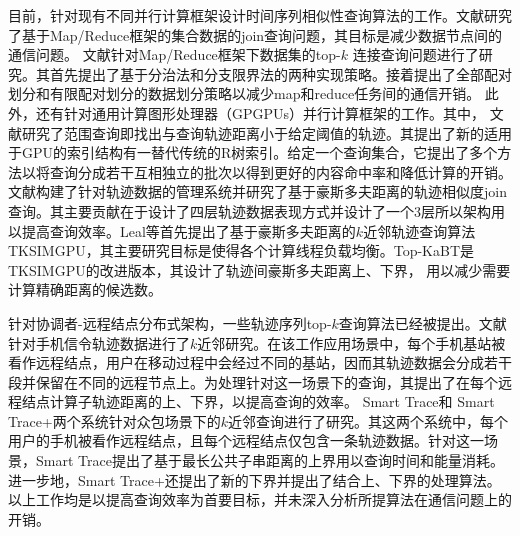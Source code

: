 目前，针对现有不同并行计算框架设计时间序列相似性查询算法的工作。文献\cite{kimICDE2012}研究了基于Map/Reduce框架的集合数据的join查询问题，其目标是减少数据节点间的通信问题。
文献\cite{kimICDE2012}针对Map/Reduce框架下数据集的top-$k$ 连接查询问题进行了研究。其首先提出了基于分治法和分支限界法的两种实现策略。接着提出了全部配对划分和有限配对划分的数据划分策略以减少map和reduce任务间的通信开销。
此外，还有针对通用计算图形处理器（GPGPUs）并行计算框架的工作\cite{GowanlockC14,Zhang2012U2STRA,LealGZY15}。其中，
文献\cite{GowanlockC14}研究了范围查询即找出与查询轨迹距离小于给定阈值的轨迹。其提出了新的适用于GPU的索引结构有一替代传统的R树索引。给定一个查询集合，它提出了多个方法以将查询分成若干互相独立的批次以得到更好的内容命中率和降低计算的开销。
文献\cite{Zhang2012U2STRA}构建了针对轨迹数据的管理系统并研究了基于豪斯多夫距离的轨迹相似度join查询。其主要贡献在于设计了四层轨迹数据表现方式并设计了一个3层所以架构用以提高查询效率。Leal等\cite{LealGZY15}首先提出了基于豪斯多夫距离的$k$近邻轨迹查询算法TKSIMGPU，其主要研究目标是使得各个计算线程负载均衡。Top-KaBT\cite{LealGZY16}是TKSIMGPU的改进版本，其设计了轨迹间豪斯多夫距离上、下界， 用以减少需要计算精确距离的候选数。

针对协调者-远程结点分布式架构，一些轨迹序列top-$k$查询算法已经被提出\cite{CIKMSimilarity,SmartTrace,crowdsourced}。文献\cite{CIKMSimilarity}针对手机信令轨迹数据进行了$k$近邻研究。在该工作应用场景中，每个手机基站被看作远程结点，用户在移动过程中会经过不同的基站，因而其轨迹数据会分成若干段并保留在不同的远程节点上。为处理针对这一场景下的查询，其提出了在每个远程结点计算子轨迹距离的上、下界，以提高查询的效率。
Smart Trace\cite{SmartTrace}和 Smart Trace+\cite{crowdsourced}两个系统针对众包场景下的$k$近邻查询进行了研究。其这两个系统中，每个用户的手机被看作远程结点，且每个远程结点仅包含一条轨迹数据。针对这一场景，Smart Trace提出了基于最长公共子串距离的上界用以查询时间和能量消耗。进一步地，Smart Trace+还提出了新的下界并提出了结合上、下界的处理算法。以上工作均是以提高查询效率为首要目标，并未深入分析所提算法在通信问题上的开销。


